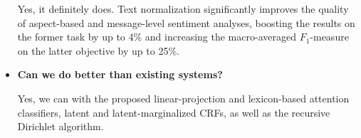 \documentclass[11pt]{article}
\newcommand{\F}[0]{$F_1$}
\begin{document}
\begin{itemize}
    Yes, it definitely does.  Text normalization significantly
    improves the quality of aspect-based and message-level sentiment
    analyses, boosting the results on the former task by up to 4\% and
    increasing the macro-averaged \F{}-measure on the latter objective
    by up to 25\%.

  \item\textbf{Can we do better than existing systems?}

    Yes, we can with the proposed linear-projection and lexicon-based
    attention classifiers, latent and latent-marginalized CRFs, as
    well as the recursive Dirichlet algorithm.
\end{itemize}



\end{document}
